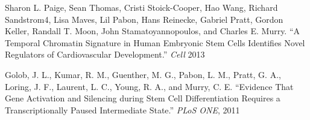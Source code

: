 \begin{frontmatter}
\begin{vitapage}
\begin{publications}
      \item Sharon L. Paige, Sean Thomas, Cristi Stoick-Cooper, Hao Wang, Richard Sandstrom4, Lisa Maves, Lil Pabon, Hans Reinecke, Gabriel Pratt, Gordon Keller, Randall T. Moon, John Stamatoyannopoulos, and Charles E. Murry. ``A Temporal Chromatin Signature in Human Embryonic Stem Cells Identifies Novel Regulators of Cardiovascular Development.'' \emph{Cell} 2013
      \item Golob, J. L., Kumar, R. M., Guenther, M. G., Pabon, L. M., Pratt, G. A., Loring, J. F., Laurent, L. C., Young, R. A., and Murry, C. E. ``Evidence That Gene Activation and Silencing during Stem Cell Differentiation Requires a Transcriptionally Paused Intermediate State.'' \emph{PLoS ONE}, 2011

\end{publications}
\end{vitapage}



\end{frontmatter}
